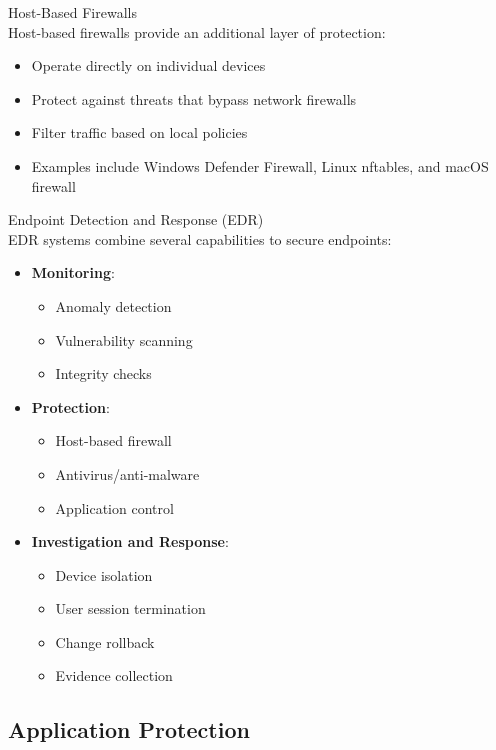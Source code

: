 \begin{definition}{Host-Based Firewalls}\\
Host-based firewalls provide an additional layer of protection:
\begin{itemize}
    \item Operate directly on individual devices
    \item Protect against threats that bypass network firewalls
    \item Filter traffic based on local policies
    \item Examples include Windows Defender Firewall, Linux nftables, and macOS firewall
\end{itemize}
\end{definition}

\begin{concept}{Endpoint Detection and Response (EDR)}\\
EDR systems combine several capabilities to secure endpoints:
\begin{itemize}
    \item \textbf{Monitoring}:
    \begin{itemize}
        \item Anomaly detection
        \item Vulnerability scanning
        \item Integrity checks
    \end{itemize}
    \item \textbf{Protection}:
    \begin{itemize}
        \item Host-based firewall
        \item Antivirus/anti-malware
        \item Application control
    \end{itemize}
    \item \textbf{Investigation and Response}:
    \begin{itemize}
        \item Device isolation
        \item User session termination
        \item Change rollback
        \item Evidence collection
    \end{itemize}
\end{itemize}
\end{concept}

\subsection{Application Protection}

